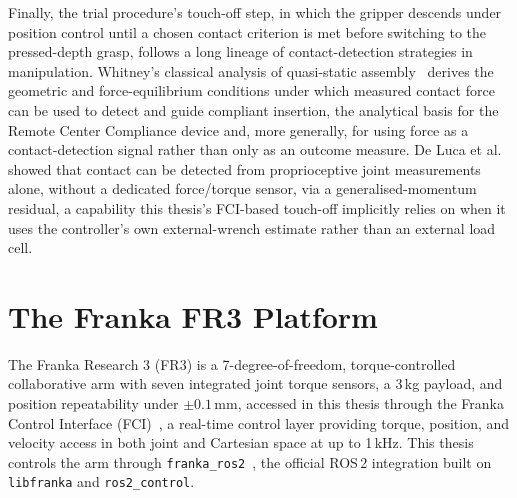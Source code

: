 Finally, the trial procedure's touch-off step, in which the gripper
descends under position control until a chosen contact criterion is met
before switching to the pressed-depth grasp, follows a long lineage of
contact-detection strategies in manipulation. Whitney's classical analysis
of quasi-static assembly~\cite{whitney1982quasistatic} derives the
geometric and force-equilibrium conditions under which measured contact
force can be used to detect and guide compliant insertion, the analytical
basis for the Remote Center Compliance device and, more generally, for
using force as a contact-detection signal rather than only as an outcome
measure. De Luca et al.~\cite{deluca2006collision} showed that contact can
be detected from proprioceptive joint measurements alone, without a
dedicated force/torque sensor, via a generalised-momentum residual, a
capability this thesis's FCI-based touch-off implicitly relies on when it
uses the controller's own external-wrench estimate rather than an external
load cell.

\section{The Franka FR3 Platform}
\label{sec:franka-platform-lit}

The Franka Research 3 (FR3) is a 7-degree-of-freedom, torque-controlled
collaborative arm with seven integrated joint torque sensors, a 3\,kg
payload, and position repeatability under $\pm 0.1$\,mm, accessed in this
thesis through the Franka Control Interface
(FCI)~\cite{franka2026fr3spec,frankarobotics2026fcidocs}, a real-time
control layer providing torque, position, and velocity access in both
joint and Cartesian space at up to 1\,kHz. This thesis controls the arm
through \texttt{franka\_ros2}~\cite{frankarobotics2026franka_ros2}, the official
ROS\,2 integration built on \texttt{libfranka} and \texttt{ros2\_control}.

